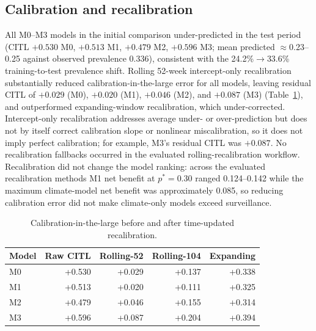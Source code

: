 \documentclass[11pt,a4paper]{article}
\begin{document}
\subsection{Calibration and recalibration}
All M0--M3 models in the initial comparison under-predicted in the test period (CITL $+0.530$ M0, $+0.513$ M1, $+0.479$ M2, $+0.596$ M3; mean predicted $\approx$0.23--0.25 against observed prevalence 0.336), consistent with the 24.2\%$\rightarrow$33.6\% training-to-test prevalence shift. Rolling 52-week intercept-only recalibration substantially reduced calibration-in-the-large error for all models, leaving residual CITL of $+0.029$ (M0), $+0.020$ (M1), $+0.046$ (M2), and $+0.087$ (M3) (Table~\ref{tab:recal}), and outperformed expanding-window recalibration, which under-corrected. Intercept-only recalibration addresses average under- or over-prediction but does not by itself correct calibration slope or nonlinear miscalibration, so it does not imply perfect calibration; for example, M3's residual CITL was $+0.087$. No recalibration fallbacks occurred in the evaluated rolling-recalibration workflow. Recalibration did not change the model ranking: across the evaluated recalibration methods M1 net benefit at $p^*=0.30$ ranged 0.124--0.142 while the maximum climate-model net benefit was approximately 0.085, so reducing calibration error did not make climate-only models exceed surveillance.

\begin{table}[htbp]
\centering
\caption{Calibration-in-the-large before and after time-updated recalibration.}
\label{tab:recal}
\small
\begin{tabular}{lrrrr}
\toprule
Model & Raw CITL & Rolling-52 & Rolling-104 & Expanding \\
\midrule
M0 & +0.530 & +0.029 & +0.137 & +0.338 \\
M1 & +0.513 & +0.020 & +0.111 & +0.325 \\
M2 & +0.479 & +0.046 & +0.155 & +0.314 \\
M3 & +0.596 & +0.087 & +0.204 & +0.394 \\
\bottomrule
\end{tabular}
\end{table}
\end{document}
